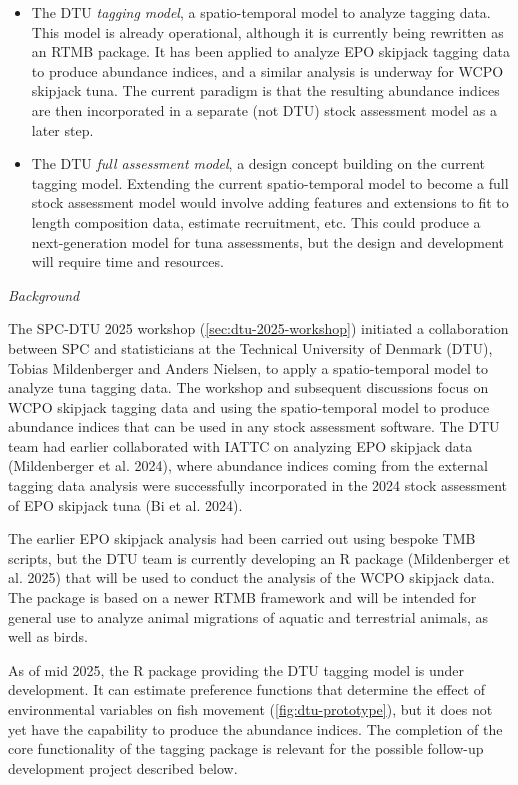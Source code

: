 \documentclass{SCreport}
\begin{document}
\begin{itemize}
  \item The DTU \emph{tagging model}, a spatio-temporal model to analyze tagging
  data. This model is already operational, although it is currently being
  rewritten as an RTMB package. It has been applied to analyze EPO skipjack
  tagging data to produce abundance indices, and a similar analysis is underway
  for WCPO skipjack tuna. The current paradigm is that the resulting abundance
  indices are then incorporated in a separate (not DTU) stock assessment model
  as a later step.
  \item The DTU \emph{full assessment model}, a design concept building on the
  current tagging model. Extending the current spatio-temporal model to become a
  full stock assessment model would involve adding features and extensions to
  fit to length composition data, estimate recruitment, etc. This could produce
  a next-generation model for tuna assessments, but the design and development
  will require time and resources.
\end{itemize}

\vspace{2ex}

\textit{Background}

The SPC-DTU 2025 workshop (\autoref{sec:dtu-2025-workshop}) initiated a
collaboration between SPC and statisticians at the Technical University of
Denmark (DTU), Tobias Mildenberger and Anders Nielsen, to apply a
spatio-temporal model to analyze tuna tagging data. The workshop and subsequent
discussions focus on WCPO skipjack tagging data and using the spatio-temporal
model to produce abundance indices that can be used in any stock assessment
software. The DTU team had earlier collaborated with IATTC on analyzing EPO
skipjack data (Mildenberger et al. 2024), where abundance indices coming from
the external tagging data analysis were successfully incorporated in the 2024
stock assessment of EPO skipjack tuna (Bi et al. 2024).

The earlier EPO skipjack analysis had been carried out using bespoke TMB
scripts, but the DTU team is currently developing an R package (Mildenberger et
al. 2025) that will be used to conduct the analysis of the WCPO skipjack data.
The package is based on a newer RTMB framework and will be intended for general
use to analyze animal migrations of aquatic and terrestrial animals, as well as
birds.

As of mid 2025, the R package providing the DTU tagging model is under
development. It can estimate preference functions that determine the effect of
environmental variables on fish movement (\autoref{fig:dtu-prototype}), but it
does not yet have the capability to produce the abundance indices. The
completion of the core functionality of the tagging package is relevant for the
possible follow-up development project described below.
\end{document}
